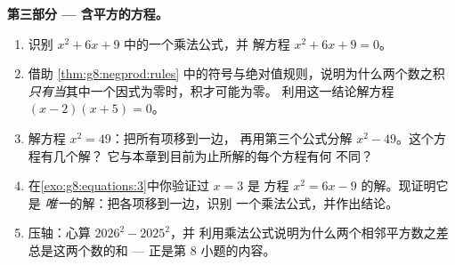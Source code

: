\begin{problem}[{周末问题 --- $(a+b)^2$，$(a-b)^2$，
$(a+b)(a-b)$，以及奇数求和 $1 + 3 + 5 + \dots + (2n-1) = n^2$}]
\medskip
\noindent\textbf{第三部分 --- 含平方的方程。}
\begin{enumerate}[resume]
  \item 识别 $x^2 + 6x + 9$ 中的一个乘法公式，并
        解方程 $x^2 + 6x + 9 = 0$。
  \item 借助 \cref{thm:g8:negprod:rules}
        中的符号与绝对值规则，说明为什么两个数之积
        \emph{只有当}其中一个因式为零时，积才可能为零。
        利用这一结论解方程 $(x - 2)(x + 5) = 0$。
  \item 解方程 $x^2 = 49$：把所有项移到一边，
        再用第三个公式分解 $x^2 - 49$。这个方程有几个解？
        它与本章到目前为止所解的每个方程有何
        不同？
  \item 在\cref{exo:g8:equations:3}中你验证过 $x = 3$ 是
        方程 $x^2 = 6x - 9$ 的解。现证明它是
        \emph{唯一}的解：把各项移到一边，识别
        一个乘法公式，并作出结论。
  \item 压轴：心算 $2026^2 - 2025^2$，并
        利用乘法公式说明为什么两个相邻平方数之差
        总是这两个数的和
        --- 正是第 8 小题的内容。
\end{enumerate}
\end{problem}
